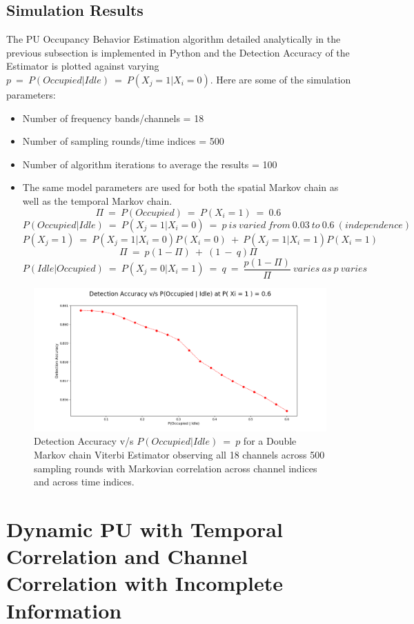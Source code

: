 \documentclass[12pt, draftcls, onecolumn]{IEEEtran}
\begin{document}
\subsection{Simulation Results}
The PU Occupancy Behavior Estimation algorithm detailed analytically in the previous subsection is implemented in Python and the Detection Accuracy of the Estimator is plotted against varying $p\ =\ P(Occupied|Idle)\ =\ P(X_j=1|X_i=0)$. Here are some of the simulation parameters:
\begin{itemize}
    \item Number of frequency bands/channels = 18
    \item Number of sampling rounds/time indices = 500
    \item Number of algorithm iterations to average the results = 100
    \item The same model parameters are used for both the spatial Markov chain as well as the temporal Markov chain.
    \[\Pi\ =\ P(Occupied)\ =\ P(X_i=1)\ =\ 0.6\]
    \[P(Occupied|Idle)\ =\ P(X_j=1|X_i=0)\ =\ p\ is\ varied\ from\ 0.03\ to\ 0.6\ (independence)\]
    \[P(X_j=1)\ =\ P(X_j=1|X_i=0)P(X_i=0)\ +\ P(X_j=1|X_i=1)P(X_i=1)\]
    \[\Pi\ =\ p(1-\Pi)\ +\ (1\ -\ q)\Pi\]
    \[P(Idle|Occupied)\ =\ P(X_j=0|X_i=1)\ =\ q\ =\ \frac{p(1-\Pi)}{\Pi}\ varies\ as\ p\ varies\]
\end{itemize}
\begin{figure}[t]
\includegraphics[width=1.0\textwidth]{Detection_Accuracy_vs_p_Iteration_1.png}
\caption{Detection Accuracy v/s $P(Occupied|Idle)\ =\ p$ for a Double Markov chain Viterbi Estimator observing all 18 channels across 500 sampling rounds with Markovian correlation across channel indices and across time indices.}
\label{fig:mesh11}
\centering
\end{figure}
\section{Dynamic PU with Temporal Correlation and Channel Correlation with Incomplete Information}
\end{document}
